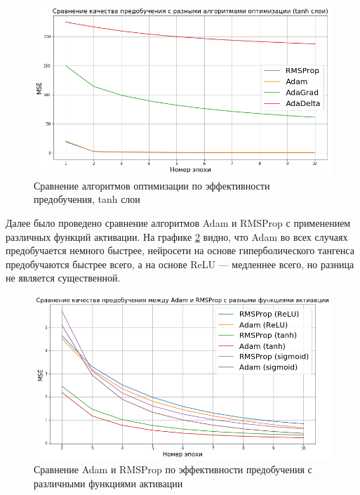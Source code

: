 \documentclass[specification, annotation]{itmo-student-thesis}
\begin{document}
\begin{figure}[!h]
  \caption{Сравнение алгоритмов оптимизации по эффективности
    предобучения, tanh слои}\label{experiment-optimizers-pretrain-tanh}
  \centering
  \includegraphics[scale=0.6]{experiment-optimizers-pretrain-tanh}
\end{figure}

Далее было проведено сравнение алгоритмов Adam и RMSProp с применением различных
функций активации. На графике
\ref{experiment-optimizers-pretrain-adam-vs-rmsprop} видно, что Adam во всех
случаях предобучается немного быстрее, нейросети на основе гиперболического
тангенса предобучаются быстрее всего, а на основе ReLU --- медленнее всего, но
разница не является существенной.

\begin{figure}[!h]
  \caption{Сравнение Adam и RMSProp по эффективности предобучения с различными
    функциями активации}\label{experiment-optimizers-pretrain-adam-vs-rmsprop}
  \centering
  \includegraphics[scale=0.6]{experiment-optimizers-pretrain-adam-vs-rmsprop}
\end{figure}
\end{document}
